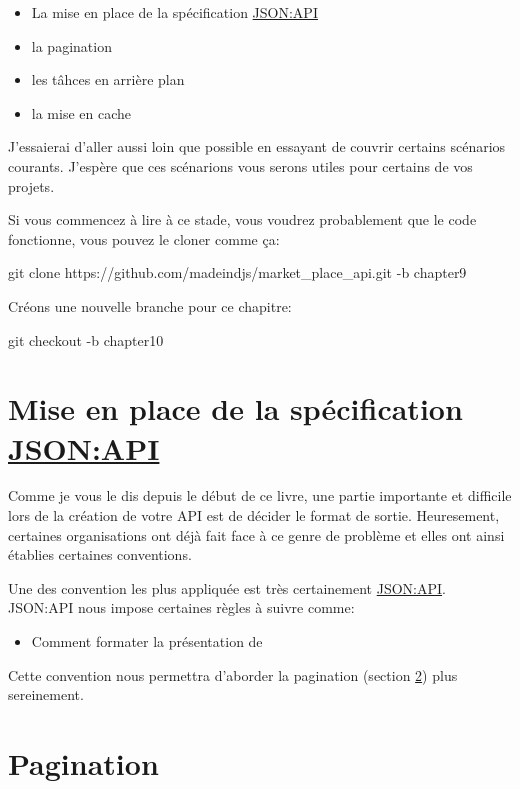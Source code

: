 \documentclass[]{report}
\begin{document}
  \begin{itemize}
      \item La mise en place de la spécification \href{https://jsonapi.org/}{JSON:API}
      \item la pagination
      \item les tâhces en arrière plan
      \item la mise en cache
  \end{itemize}

  J'essaierai d'aller aussi loin que possible en essayant de couvrir certains scénarios courants. J'espère que ces scénarions vous serons utiles pour certains de vos projets.

  Si vous commencez à lire à ce stade, vous voudrez probablement que le code fonctionne, vous pouvez le cloner comme ça:

  \begin{bashcode}
  git clone https://github.com/madeindjs/market_place_api.git -b chapter9
  \end{bashcode}

  Créons une nouvelle branche pour ce chapitre:

  \begin{bashcode}
  git checkout -b chapter10
  \end{bashcode}

  \section{Mise en place de la spécification \href{https://jsonapi.org/}{JSON:API}}

    Comme je vous le dis depuis le début de ce livre, une partie importante et difficile lors de la création de votre API est de décider le format de sortie. Heuresement, certaines organisations ont déjà fait face à ce genre de problème et elles ont ainsi établies certaines conventions.

    Une des convention les plus appliquée est très certainement \href{https://jsonapi.org/}{JSON:API}. JSON:API nous impose certaines règles à suivre comme:

    \begin{itemize}
      \item Comment formater la présentation de
    \end{itemize}

    Cette convention nous permettra d'aborder la pagination (section \ref{sec:pagination}) plus sereinement.


  \section{Pagination}\label{sec:pagination}
\end{document}

